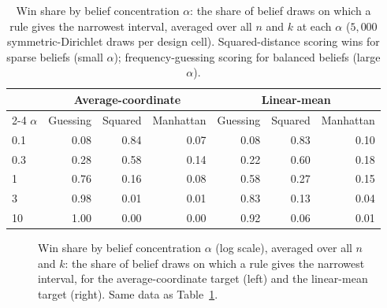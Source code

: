 \begin{table}[h]
\centering
\small
\begin{tabular}{lrrrrrr}
\hline
& \multicolumn{3}{c}{Average-coordinate} & \multicolumn{3}{c}{Linear-mean}\\
\cline{2-4}\cline{5-7}
\(\alpha\) & Guessing & Squared & Manhattan & Guessing & Squared & Manhattan\\
\hline
0.1 & 0.08 & 0.84 & 0.07 & 0.08 & 0.83 & 0.10\\
0.3 & 0.28 & 0.58 & 0.14 & 0.22 & 0.60 & 0.18\\
1   & 0.76 & 0.16 & 0.08 & 0.58 & 0.27 & 0.15\\
3   & 0.98 & 0.01 & 0.01 & 0.83 & 0.13 & 0.04\\
10  & 1.00 & 0.00 & 0.00 & 0.92 & 0.06 & 0.01\\
\hline
\end{tabular}
\caption{Win share by belief concentration \(\alpha\): the share of belief draws on which a rule gives the narrowest interval, averaged over all \(n\) and \(k\) at each \(\alpha\) (\(5{,}000\) symmetric-Dirichlet draws per design cell). Squared-distance scoring wins for sparse beliefs (small \(\alpha\)); frequency-guessing scoring for balanced beliefs (large \(\alpha\)).}
\label{tab:regime-wins}
\end{table}

\begin{figure}[h]
\centering

\caption{Win share by belief concentration \(\alpha\) (log scale), averaged over all \(n\) and \(k\): the share of belief draws on which a rule gives the narrowest interval, for the average-coordinate target (left) and the linear-mean target (right). Same data as Table~\ref{tab:regime-wins}.}
\label{fig:regime-wins}
\end{figure}

